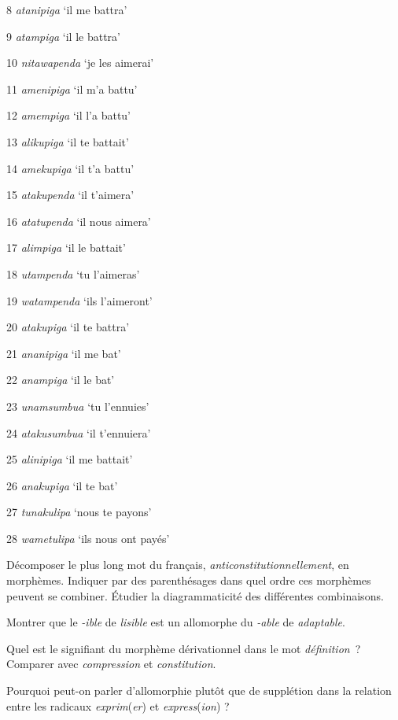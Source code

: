 {    8  \textit{atanipiga}  ‘il me battra’

    9  \textit{atampiga}  ‘il le battra’

    10  \textit{nitawapenda}  ‘je les aimerai’

    11  \textit{amenipiga}  ‘il m’a battu’

    12  \textit{amempiga}  ‘il l’a battu’

    13  \textit{alikupiga}  ‘il te battait’

    14  \textit{amekupiga}  ‘il t’a battu’

    15  \textit{atakupenda}  ‘il t’aimera’

    16  \textit{atatupenda}  ‘il nous aimera’

    17  \textit{alimpiga}    ‘il le battait’

    18  \textit{utampenda}  ‘tu l’aimeras’

    19  \textit{watampenda}  ‘ils l’aimeront’

    20  \textit{atakupiga}  ‘il te battra’

    21  \textit{ananipiga}  ‘il me bat’

    22  \textit{anampiga}  ‘il le bat’

    23  \textit{unamsumbua}  ‘tu l’ennuies’

    24  \textit{atakusumbua}  ‘il t’ennuiera’

    25  \textit{alinipiga}    ‘il me battait’

    26  \textit{anakupiga}   ‘il te bat’

    27  \textit{tunakulipa}   ‘nous te payons’

    28  \textit{wametulipa}  ‘ils nous ont payés’

     Décomposer le plus long mot du français, \textit{anticonstitutionnellement}, en morphèmes. Indiquer par des parenthésages dans quel ordre ces morphèmes peuvent se combiner. Étudier la diagrammaticité des différentes combinaisons.

     Montrer que le \textit{{}-ible} de \textit{lisible} est un allomorphe du \textit{{}-able} de \textit{adaptable}.

     Quel est le signifiant du morphème dérivationnel dans le mot \textit{définition~}? Comparer avec \textit{compression} et \textit{constitution}.

     Pourquoi peut-on parler d’allomorphie plutôt que de supplétion dans la relation entre les radicaux \textit{exprim}(\textit{er}) et \textit{express}(\textit{ion}) ?

}
